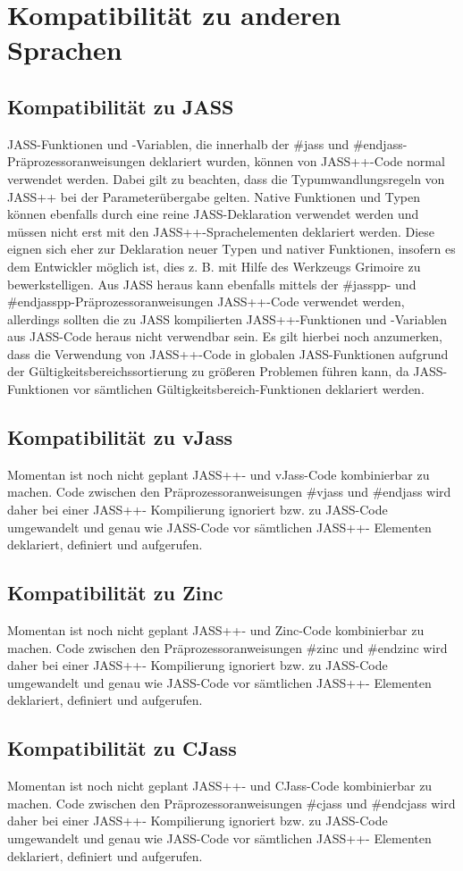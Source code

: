 \chapter { Kompatibilität zu anderen Sprachen }

\section { Kompatibilität zu JASS }
JASS-Funktionen und -Variablen, die innerhalb der #jass und #endjass-Präprozessoranweisungen
deklariert wurden, können von JASS++-Code normal verwendet werden. Dabei gilt zu beachten,
dass die Typumwandlungsregeln von JASS++ bei der Parameterübergabe gelten.
Native Funktionen und Typen können ebenfalls durch eine reine JASS-Deklaration verwendet werden
und müssen nicht erst mit den JASS++-Sprachelementen deklariert werden. Diese eignen sich eher
zur Deklaration neuer Typen und nativer Funktionen, insofern es dem Entwickler möglich ist, dies
z. B. mit Hilfe des Werkzeugs Grimoire zu bewerkstelligen.
Aus JASS heraus kann ebenfalls mittels der #jasspp- und #endjasspp-Präprozessoranweisungen JASS++-Code
verwendet werden, allerdings sollten die zu JASS kompilierten JASS++-Funktionen und -Variablen
aus JASS-Code heraus nicht verwendbar sein.
Es gilt hierbei noch anzumerken, dass die Verwendung von JASS++-Code in globalen JASS-Funktionen
aufgrund der Gültigkeitsbereichssortierung zu größeren Problemen führen kann, da JASS-Funktionen vor sämtlichen
Gültigkeitsbereich-Funktionen deklariert werden.

\section { Kompatibilität zu vJass }
Momentan ist noch nicht geplant JASS++- und vJass-Code kombinierbar zu machen.
Code zwischen den Präprozessoranweisungen #vjass und #endjass wird daher bei einer JASS++-
Kompilierung ignoriert bzw. zu JASS-Code umgewandelt und genau wie JASS-Code vor sämtlichen JASS++-
Elementen deklariert, definiert und aufgerufen.

\section { Kompatibilität zu Zinc }
Momentan ist noch nicht geplant JASS++- und Zinc-Code kombinierbar zu machen.
Code zwischen den Präprozessoranweisungen #zinc und #endzinc wird daher bei einer JASS++-
Kompilierung ignoriert bzw. zu JASS-Code umgewandelt und genau wie JASS-Code vor sämtlichen JASS++-
Elementen deklariert, definiert und aufgerufen.

\section { Kompatibilität zu CJass }
Momentan ist noch nicht geplant JASS++- und CJass-Code kombinierbar zu machen.
Code zwischen den Präprozessoranweisungen #cjass und #endcjass wird daher bei einer JASS++-
Kompilierung ignoriert bzw. zu JASS-Code umgewandelt und genau wie JASS-Code vor sämtlichen JASS++-
Elementen deklariert, definiert und aufgerufen. 

